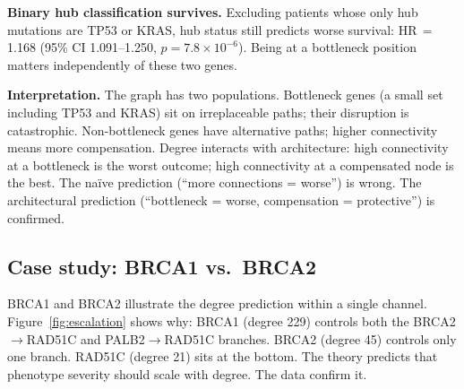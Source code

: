 \documentclass[11pt]{article}
\begin{document}
\textbf{Binary hub classification survives.}
Excluding patients whose only hub mutations are TP53 or KRAS,
hub status still predicts worse survival: HR\,$=$\,1.168 (95\% CI
1.091--1.250, $p = 7.8 \times 10^{-6}$). Being at a bottleneck
position matters independently of these two genes.

\textbf{Interpretation.}
The graph has two populations. Bottleneck genes (a small set
including TP53 and KRAS) sit on irreplaceable paths; their
disruption is catastrophic. Non-bottleneck genes have alternative
paths; higher connectivity means more compensation. Degree
interacts with architecture: high connectivity at a bottleneck is
the worst outcome; high connectivity at a compensated node is the
best. The na\"ive prediction (``more connections = worse'') is
wrong. The architectural prediction (``bottleneck = worse,
compensation = protective'') is confirmed.

\subsection{Case study: BRCA1 vs.\ BRCA2}
\label{sec:brca}

BRCA1 and BRCA2 illustrate the degree prediction within a single
channel. Figure~\ref{fig:escalation} shows why: BRCA1 (degree 229)
controls both the BRCA2$\to$RAD51C and PALB2$\to$RAD51C branches.
BRCA2 (degree 45) controls only one branch. RAD51C (degree 21) sits
at the bottom. The theory predicts that phenotype severity should
scale with degree. The data confirm it.
\end{document}
